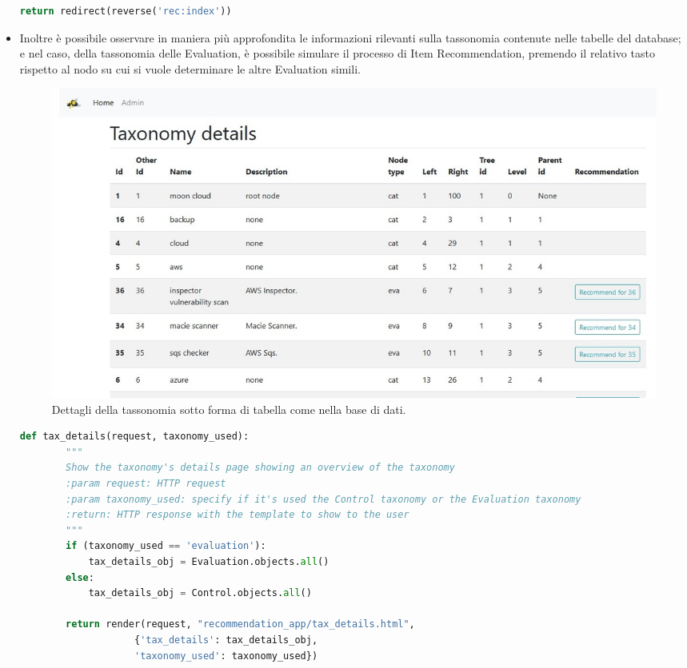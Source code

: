 \begin{itemize}
\begin{lstlisting}[language=Python, label=lst:view_DOT_eval, caption={Codice utilizzato per la realizzazione del
        file .dot e relativa immagine .jpg.}]
        return redirect(reverse('rec:index'))
    \end{lstlisting}
    \item Inoltre è possibile osservare in maniera più approfondita le informazioni rilevanti sulla tassonomia contenute nelle 
    tabelle del database; e nel caso, della tassonomia delle Evaluation, è possibile simulare il processo di Item Recommendation, 
    premendo il relativo tasto rispetto al nodo su cui si vuole determinare le altre Evaluation simili.
    \begin{figure}[ht!]
        \centering
        \includegraphics[scale=0.41]{images/MCRS_taxdetails.jpg}
        \caption[Dettagli della tassonomia sotto forma di tabella]{Dettagli della tassonomia sotto forma di tabella come nella base di dati.}
        \label{fig:MCRS_taxdetails}
    \end{figure}
    \lstset{style=python_code_style}
    \begin{lstlisting}[language=Python, label=lst:view_taxdetails, caption={Codice utilizzato per la realizzazione della View che 
        implementa la pagina web del dettaglio della Tassonomia.}]
    def tax_details(request, taxonomy_used):
        """
        Show the taxonomy's details page showing an overview of the taxonomy
        :param request: HTTP request
        :param taxonomy_used: specify if it's used the Control taxonomy or the Evaluation taxonomy
        :return: HTTP response with the template to show to the user
        """
        if (taxonomy_used == 'evaluation'):
            tax_details_obj = Evaluation.objects.all()
        else:
            tax_details_obj = Control.objects.all()
 
        return render(request, "recommendation_app/tax_details.html",
                    {'tax_details': tax_details_obj,
                    'taxonomy_used': taxonomy_used})
    \end{lstlisting}
\end{itemize}
%
\newpage
%
